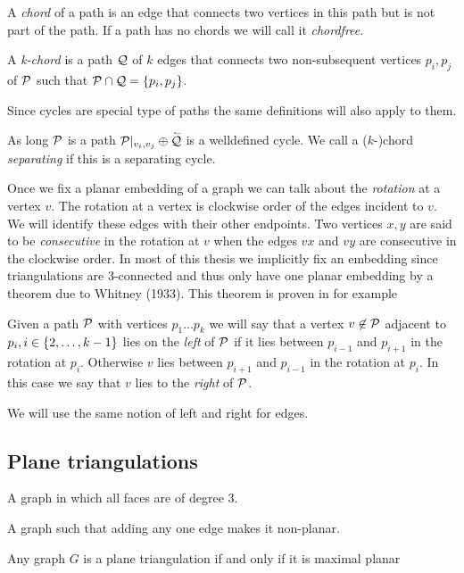  A \emph{chord} of a path is an edge that connects two vertices in this path but is not part of the path. If a path has no chords we will call it \emph{chordfree}.

  A \emph{k-chord} is a path $\Q$ of $k$ edges that connects two non-subsequent vertices $p_i, p_j$ of $\P$ such that $\P \cap \Q = \braces{p_i, p_j}$.

  Since cycles are special type of paths the same definitions will also apply to them.

  As long $\P$ is a path $\P|_{v_i, v_j} \oplus \rev{\Q}$ is a welldefined cycle. We call a ($k$-)chord \emph{separating} if this is a separating cycle.

  Once we fix a planar embedding of a graph we can talk about the \emph{rotation} at a vertex $v$. The rotation at a vertex is clockwise order of the edges incident to $v$. We will identify these edges with their other endpoints. Two vertices $x, y$ are said to be \emph{consecutive} in the rotation at $v$ when the edges $vx$ and $vy$ are consecutive in the clockwise order. In most of this thesis we implicitly fix an embedding since triangulations are 3-connected and thus only have one planar embedding by a theorem due to Whitney (1933). This theorem is proven in for example \cite[p. 267]{Bondy2008}

  Given a path $\P$ with vertices $p_1 \ldots p_k$ we will say that a vertex $v \nin \P$ adjacent to $p_i, i \in \braces{2, \ldots, k-1}$ lies on the \emph{left} of $\P$ if it lies between $p_{i-1}$ and $p_{i+1}$ in the rotation at $p_{i}$. Otherwise $v$ lies between $p_{i+1}$ and $p_{i-1}$ in the
  rotation at $p_i$. In this case we say that $v$ lies to the \emph{right} of $\P$.

  We will use the same notion of left and right for edges.

\subsection{Plane triangulations}

\begin{defi} 
A graph in which all faces are of degree $3$.
\end{defi}

\begin{defi} 
A graph such that adding any one edge makes it non-planar.
\end{defi}

\begin{thrm}
Any graph $G$ is a plane triangulation if and only if it is maximal planar
\end{thrm}

